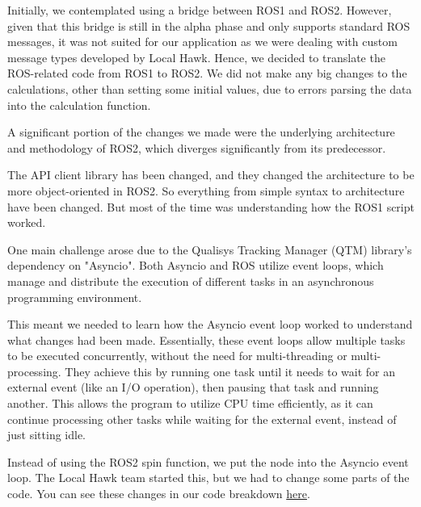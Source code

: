 Initially, we contemplated using a bridge between ROS1 and ROS2. However, given that this bridge is still in the alpha phase and only supports standard ROS messages, it was not suited for our application as we were dealing with custom message types developed by Local Hawk. Hence, we decided to translate the ROS-related code from ROS1 to ROS2. We did not make any big changes to the calculations, other than setting some initial values, due to errors parsing the data into the calculation function.

A significant portion of the changes we made were the underlying architecture and methodology of ROS2, which diverges significantly from its predecessor.

The API client library has been changed, and they changed the architecture to be more object-oriented in ROS2. So everything from simple syntax to architecture have been changed. But most of the time was understanding how the ROS1 script worked.

One main challenge arose due to the Qualisys Tracking Manager (QTM) library's dependency on "Asyncio". Both Asyncio and ROS utilize event loops, which manage and distribute the execution of different tasks in an asynchronous programming environment.

This meant we needed to learn how the Asyncio event loop worked to understand what changes had been made. Essentially, these event loops allow multiple tasks to be executed concurrently, without the need for multi-threading or multi-processing. They achieve this by running one task until it needs to wait for an external event (like an I/O operation), then pausing that task and running another. This allows the program to utilize CPU time efficiently, as it can continue processing other tasks while waiting for the external event, instead of just sitting idle.\cite{loopRTS} \newpage

Instead of using the ROS2 spin function, we put the node into the Asyncio event loop. The Local Hawk team started this, but we had to change some parts of the code. You can see these changes in our code breakdown \hyperref[ch:ros1toros2]{here}.

